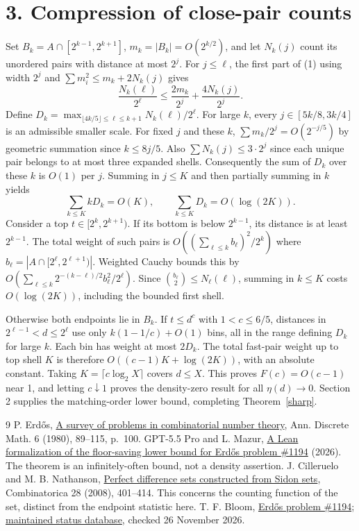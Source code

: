 \documentclass[10pt,a4paper]{article}
\begin{document}
\section*{3. Compression of close-pair counts}
Set $B_k=A\cap[2^{k-1},2^{k+1}]$, $m_k=|B_k|=O(2^{k/2})$, and let $N_k(j)$ count its unordered pairs with distance at most $2^j$. For $j\le\ell$, the first part of (1) using width $2^j$ and $\sum m_i^2\le m_k+2N_k(j)$ gives
\[
 \frac{N_k(\ell)}{2^\ell}\le\frac{2m_k}{2^j}+\frac{4N_k(j)}{2^j}.
\]
Define $D_k=\max_{\lfloor4k/5\rfloor\le\ell\le k+1}N_k(\ell)/2^\ell$. For large $k$, every $j\in[5k/8,3k/4]$ is an admissible smaller scale. For fixed $j$ and these $k$, $\sum m_k/2^j=O(2^{-j/5})$ by geometric summation since $k\le8j/5$. Also $\sum N_k(j)\le3\cdot2^j$ since each unique pair belongs to at most three expanded shells. Consequently the sum of $D_k$ over these $k$ is $O(1)$ per $j$. Summing in $j\le K$ and then partially summing in $k$ yields
\[
 \sum_{k\le K} kD_k=O(K),\qquad\sum_{k\le K}D_k=O(\log(2K)).
\]
Consider a top $t\in[2^k,2^{k+1})$. If its bottom is below $2^{k-1}$, its distance is at least $2^{k-1}$. The total weight of such pairs is $O((\sum_{\ell\le k}b_\ell)^2/2^k)$ where $b_\ell=|A\cap[2^\ell,2^{\ell+1})|$. Weighted Cauchy bounds this by $O(\sum_{\ell\le k}2^{-(k-\ell)/2}b_\ell^2/2^\ell)$. Since $\binom{b_\ell}{2}\le N_\ell(\ell)$, summing in $k\le K$ costs $O(\log(2K))$, including the bounded first shell.

Otherwise both endpoints lie in $B_k$. If $t\le d^c$ with $1<c\le6/5$, distances in $2^{\ell-1}<d\le2^\ell$ use only $k(1-1/c)+O(1)$ bins, all in the range defining $D_k$ for large $k$. Each bin has weight at most $2D_k$. The total fast-pair weight up to top shell $K$ is therefore $O((c-1)K+\log(2K))$, with an absolute constant. Taking $K=\lceil c\log_2 X\rceil$ covers $d\le X$. This proves $F(c)=O(c-1)$ near 1, and letting $c\downarrow1$ proves the density-zero result for all $\eta(d)\to0$. Section 2 supplies the matching-order lower bound, completing Theorem~\ref{sharp}.

\begin{thebibliography}{9}\small
{} P. Erd\H os, \href{https://www.renyi.hu/~p_erdos/1980-03.pdf}{A survey of problems in combinatorial number theory}, Ann. Discrete Math. 6 (1980), 89--115, p.~100.
 GPT-5.5 Pro and L. Mazur, \href{https://github.com/lechmazur/erdos_1194}{A Lean formalization of the floor-saving lower bound for Erd\H os problem \#1194} (2026). The theorem is an infinitely-often bound, not a density assertion.
 J. Cilleruelo and M. B. Nathanson, \href{https://arxiv.org/abs/math/0609244}{Perfect difference sets constructed from Sidon sets}, Combinatorica 28 (2008), 401--414. This concerns the counting function of the set, distinct from the endpoint statistic here.
 T. F. Bloom, \href{https://www.erdosproblems.com/1194}{Erd\H os problem \#1194}; \href{https://github.com/teorth/erdosproblems/blob/main/data/problems.yaml}{maintained status database}, checked 26 November 2026.
\end{thebibliography}
\end{document}
